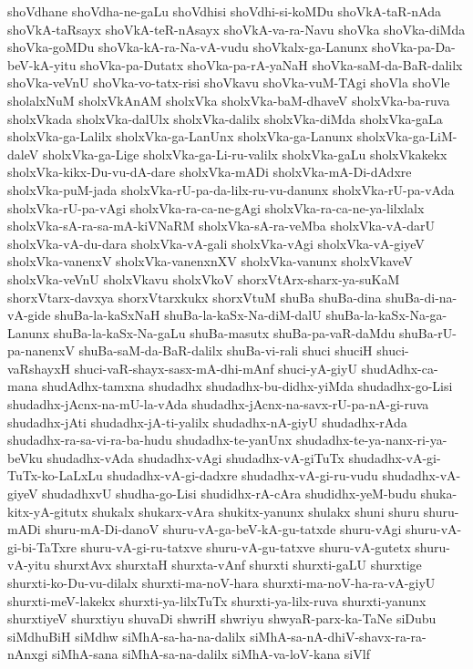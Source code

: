{shoVdhane
shoVdha-ne-gaLu
shoVdhisi
shoVdhi-si-koMDu
shoVkA-taR-nAda
shoVkA-taRsayx
shoVkA-teR-nAsayx
shoVkA-va-ra-Navu
shoVka
shoVka-diMda
shoVka-goMDu
shoVka-kA-ra-Na-vA-vudu
shoVkalx-ga-Lanunx
shoVka-pa-Da-beV-kA-yitu
shoVka-pa-Dutatx
shoVka-pa-rA-yaNaH
shoVka-saM-da-BaR-dalilx
shoVka-veVnU
shoVka-vo-tatx-risi
shoVkavu
shoVka-vuM-TAgi
shoVla
shoVle
sholalxNuM
sholxVkAnAM
sholxVka
sholxVka-baM-dhaveV
sholxVka-ba-ruva
sholxVkada
sholxVka-dalUlx
sholxVka-dalilx
sholxVka-diMda
sholxVka-gaLa
sholxVka-ga-Lalilx
sholxVka-ga-LanUnx
sholxVka-ga-Lanunx
sholxVka-ga-LiM-daleV
sholxVka-ga-Lige
sholxVka-ga-Li-ru-valilx
sholxVka-gaLu
sholxVkakekx
sholxVka-kikx-Du-vu-dA-dare
sholxVka-mADi
sholxVka-mA-Di-dAdxre
sholxVka-puM-jada
sholxVka-rU-pa-da-lilx-ru-vu-danunx
sholxVka-rU-pa-vAda
sholxVka-rU-pa-vAgi
sholxVka-ra-ca-ne-gAgi
sholxVka-ra-ca-ne-ya-lilxlalx
sholxVka-sA-ra-sa-mA-kiVNaRM
sholxVka-sA-ra-veMba
sholxVka-vA-darU
sholxVka-vA-du-dara
sholxVka-vA-gali
sholxVka-vAgi
sholxVka-vA-giyeV
sholxVka-vanenxV
sholxVka-vanenxnXV
sholxVka-vanunx
sholxVkaveV
sholxVka-veVnU
sholxVkavu
sholxVkoV
shorxVtArx-sharx-ya-suKaM
shorxVtarx-davxya
shorxVtarxkukx
shorxVtuM
shuBa
shuBa-dina
shuBa-di-na-vA-gide
shuBa-la-kaSxNaH
shuBa-la-kaSx-Na-diM-dalU
shuBa-la-kaSx-Na-ga-Lanunx
shuBa-la-kaSx-Na-gaLu
shuBa-masutx
shuBa-pa-vaR-daMdu
shuBa-rU-pa-nanenxV
shuBa-saM-da-BaR-dalilx
shuBa-vi-rali
shuci
shuciH
shuci-vaRshayxH
shuci-vaR-shayx-sasx-mA-dhi-mAnf
shuci-yA-giyU
shudAdhx-ca-mana
shudAdhx-tamxna
shudadhx
shudadhx-bu-didhx-yiMda
shudadhx-go-Lisi
shudadhx-jAcnx-na-mU-la-vAda
shudadhx-jAcnx-na-savx-rU-pa-nA-gi-ruva
shudadhx-jAti
shudadhx-jA-ti-yalilx
shudadhx-nA-giyU
shudadhx-rAda
shudadhx-ra-sa-vi-ra-ba-hudu
shudadhx-te-yanUnx
shudadhx-te-ya-nanx-ri-ya-beVku
shudadhx-vAda
shudadhx-vAgi
shudadhx-vA-giTuTx
shudadhx-vA-gi-TuTx-ko-LaLxLu
shudadhx-vA-gi-dadxre
shudadhx-vA-gi-ru-vudu
shudadhx-vA-giyeV
shudadhxvU
shudha-go-Lisi
shudidhx-rA-cAra
shudidhx-yeM-budu
shuka-kitx-yA-gitutx
shukalx
shukarx-vAra
shukitx-yanunx
shulakx
shuni
shuru
shuru-mADi
shuru-mA-Di-danoV
shuru-vA-ga-beV-kA-gu-tatxde
shuru-vAgi
shuru-vA-gi-bi-TaTxre
shuru-vA-gi-ru-tatxve
shuru-vA-gu-tatxve
shuru-vA-gutetx
shuru-vA-yitu
shurxtAvx
shurxtaH
shurxta-vAnf
shurxti
shurxti-gaLU
shurxtige
shurxti-ko-Du-vu-dilalx
shurxti-ma-noV-hara
shurxti-ma-noV-ha-ra-vA-giyU
shurxti-meV-lakekx
shurxti-ya-lilxTuTx
shurxti-ya-lilx-ruva
shurxti-yanunx
shurxtiyeV
shurxtiyu
shuvaDi
shwriH
shwriyu
shwyaR-parx-ka-TaNe
siDubu
siMdhuBiH
siMdhw
siMhA-sa-ha-na-dalilx
siMhA-sa-nA-dhiV-shavx-ra-ra-nAnxgi
siMhA-sana
siMhA-sa-na-dalilx
siMhA-va-loV-kana
siVlf
}
